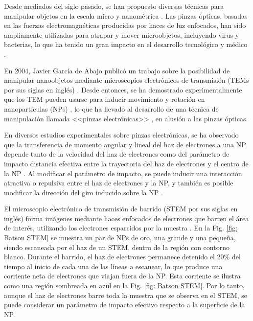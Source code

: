 \label{cap: introduccion}

Desde mediados del siglo pasado, se han propuesto diversas técnicas para manipular objetos en la escala micro y nanométrica \cite{ashkin1970acceleration, ashkin1987optical, Ashkin, custance2009atomic, dholakia2011shaping, marago2013optical, romo2020controlled}. Las pinzas ópticas, basadas en las fuerzas electromagnéticas producidas por haces de luz enfocados, han sido ampliamente utilizadas para atrapar y mover microobjetos, incluyendo virus y bacterias, lo que ha tenido un gran impacto en el desarrollo tecnológico y médico \cite{ashkin1970acceleration, ashkin1987optical, Ashkin}.  

En 2004, Javier García de Abajo publicó un trabajo sobre la posibilidad de manipular nanoobjetos mediante microscopios electrónicos de transmisión (TEMs por sus siglas en inglés) \cite{GarciadeAbajo0}. Desde entonces, se ha demostrado experimentalmente que los TEM pueden usarse para inducir movimiento y rotación en nanopartículas (NPs) \cite{Batson01, zheng2012electron}, lo que ha llevado al desarrollo de una técnica de manipulación llamada <<pinzas electrónicas>> \cite{Batson, oleshko2005electron, Oleshko}, en alusión a las pinzas ópticas.

En diversos estudios experimentales sobre pinzas electrónicas, se ha observado que la transferencia de momento angular y lineal del haz de electrones a una NP depende tanto de la velocidad del haz de electrones como del parámetro de impacto \textemdash distancia efectiva entre la trayectoria del haz de electrones y el centro de la NP \cite{OLESHKO2013203, Oleshko, Batson, Batson01, zheng2012electron, xu2010transmission}\textemdash.  Al modificar el parámetro de impacto, se puede inducir una interacción atractiva o repulsiva entre el haz de electrones y la NP, y también es posible modificar la dirección del giro inducido sobre la NP \cite{OLESHKO2013203, Batson, Oleshko}. 

El microscopio electrónico de transmisión de barrido (STEM por sus siglas en inglés) forma imágenes mediante haces enfocados de electrones que barren el área de interés, utilizando los electrones esparcidos por la muestra \cite{Batson}. En la Fig. \ref{fig: Batson STEM} se muestra un par de NPs de oro, una grande y una pequeña, siendo escaneada por el haz de un STEM, dentro de la región con contorno blanco. Durante el barrido, el haz de electrones permanece detenido el 20\% del tiempo al inicio de cada una de las líneas a escanear, lo que produce una corriente neta de electrones que viajan fuera de la NP. Esta corriente se ilustra como una región sombreada en azul en la Fig. \ref{fig: Batson STEM}. Por lo tanto, aunque el haz de electrones barre toda la muestra que se observa en el STEM, se puede considerar un parámetro de impacto efectivo respecto a la superficie de la NP.

